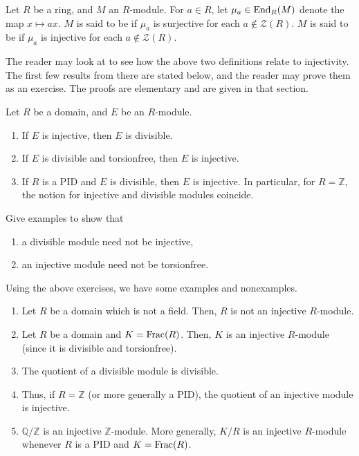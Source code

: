 \begin{defn}
	Let $R$ be a ring, and $M$ an $R$-module. For $a \in R$, let $\mu_{a} \in \operatorname{End}_{R}(M)$ denote the map $x \mapsto a x$. \newline
	$M$ is said to be  if $\mu_{a}$ is surjective for each $a \notin \mathcal{Z}(R)$. \newline
	$M$ is said to be  if $\mu_{a}$ is injective for each $a \notin \mathcal{Z}(R)$.
\end{defn}

The reader may look at  to see how the above two definitions relate to injectivity. The first few results from there are stated below, and the reader may prove them as an exercise. The proofs are elementary and are given in that section.

\begin{exe}
	Let $R$ be a domain, and $E$ be an $R$-module.
	\begin{enumerate}
		\item If $E$ is injective, then $E$ is divisible.
		\item If $E$ is divisible and torsionfree, then $E$ is injective.
		\item If $R$ is a PID and $E$ is divisible, then $E$ is injective. In particular, for $R = \mathbb{Z}$, the notion for injective and divisible modules coincide.
	\end{enumerate}
\end{exe}
\begin{exe}
	Give examples to show that
	\begin{enumerate}
		\item a divisible module need not be injective,
		\item an injective module need not be torsionfree.
	\end{enumerate}
\end{exe}

\begin{ex}
	Using the above exercises, we have some examples and nonexamples.
	\begin{enumerate}
		\item Let $R$ be a domain which is not a field. Then, $R$ is not an injective $R$-module.
		\item Let $R$ be a domain and $K = \operatorname{Frac}(R)$. Then, $K$ is an injective $R$-module (since it is divisible and torsionfree).
		\item The quotient of a divisible module is divisible.
		\item Thus, if $R = \mathbb{Z}$ (or more generally a PID), the quotient of an injective module is injective. 
		\item $\mathbb{Q}/\mathbb{Z}$ is an injective $\mathbb{Z}$-module. More generally, $K/R$ is an injective $R$-module whenever $R$ is a PID and $K = \operatorname{Frac}(R)$.
	\end{enumerate}
\end{ex}

